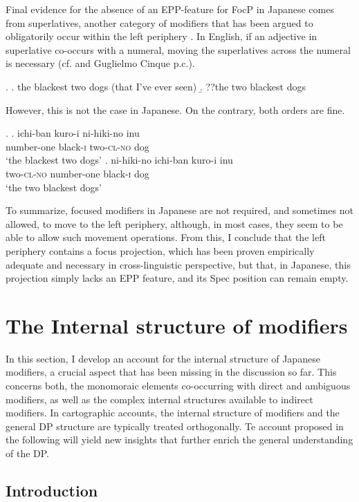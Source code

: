 \documentclass [output=book,colorlinks,citecolor=brown]{langscibook}
\begin{document}
Final evidence for the absence of an EPP-feature for FocP in Japanese comes from superlatives, another category of modifiers that has been argued to obligatorily occur within the left periphery \citep{cinque:2010:adj, cinque:2023:linearization}. In English, if an adjective in superlative co-occurs with a numeral, moving the superlatives across the numeral is necessary (cf. \citealt[11]{cinque:2023:linearization} and Guglielmo Cinque p.c.). %

\ex. \a. the blackest two dogs (that I've ever seen)
\b. ??the two blackest dogs

However, this is not the case in Japanese. On the contrary, both orders are fine.

\ex. \ag. ichi-ban kuro-i ni-hiki-no inu\\
number-one black-\textsc{i} two-\textsc{cl-no} dog\\
`the blackest two dogs'
\bg. ni-hiki-no ichi-ban kuro-i inu\\
two-\textsc{cl-no} number-one black-\textsc{i} dog\\
`the two blackest dogs'

To summarize, focused modifiers in Japanese are not required, and sometimes not allowed, to move to the left periphery, although, in most cases, they seem to be able to allow such movement operations. From this, I conclude that the left periphery contains a focus projection, which has been proven empirically adequate and necessary in cross-linguistic perspective, but that, in Japanese, this projection simply lacks an EPP feature, and its Spec position can remain empty.

\section{The Internal structure of modifiers} \label{internalstructure}

In this section, I develop an account for the internal structure of Japanese modifiers, a crucial aspect that has been missing in the discussion so far. This concerns both, the monomoraic elements co-occurring with direct and ambiguous modifiers, as well as the complex internal structures available to indirect modifiers. In cartographic accounts, the internal structure of modifiers and the general DP structure are typically treated orthogonally. Te account proposed in the following will yield new insights that further enrich the general understanding of the DP.

\subsection{Introduction}
\end{document}

